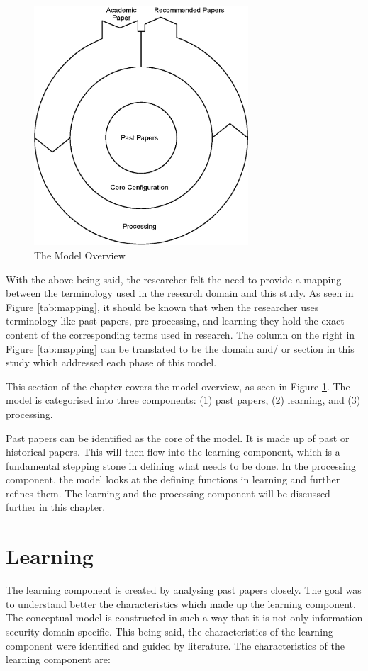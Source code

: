 \begin{figure}[htbp]
\centering
\includegraphics[width=8cm]{./figures/overview3.eps}
\caption{The Model Overview}
\label{fig:Modeloverview}
\end{figure}

With the above being said, the researcher felt the need to provide a mapping between the terminology used in the research domain and this study. As seen in Figure \ref{tab:mapping}, it should be known that when the researcher uses terminology like past papers, pre-processing, and learning they hold the exact content of the corresponding terms used in research. The column on the right in Figure \ref{tab:mapping} can be translated to be the domain and/ or section in this study which addressed each phase of this model.

This section of the chapter covers the model overview, as seen in Figure \ref{fig:Modeloverview}. The model is categorised into three components: (1) past papers, (2) learning, and (3) processing.

Past papers can be identified as the core of the model. It is made up of past or historical papers. This will then flow into the learning component, which is a fundamental stepping stone in defining what needs to be done. In the processing component, the model looks at the defining functions in learning and further refines them. The learning and the processing component will be discussed further in this chapter.

\section{Learning}

The learning component is created by analysing past papers closely. The goal was to understand better the characteristics which made up the learning component. The conceptual model is constructed in such a way that it is not only information security domain-specific. This being said, the characteristics of the learning component were identified and guided by literature. The characteristics of the learning component are:

